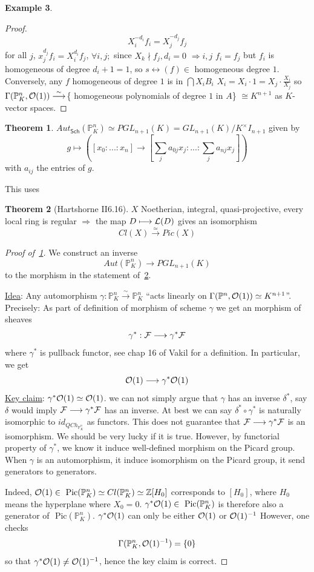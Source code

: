 \documentclass[11pt]{article}
\theoremstyle{definition}
\newtheorem{thm}{Theorem}[section]
\newtheorem{ex}[thm]{Example}
\newcommand{\pic}{\text{ Pic}}
\newcommand{\proj}{\mathbb P}
\newcommand{\intg}{\mathbb Z}
\newcommand{\calf}{{\cal F}}
\newcommand{\call}{{\cal L}}
\newcommand{\calo}{{\cal O}}
\newcommand{\Lrta}{\Longrightarrow}
\newcommand{\lrta}{\longrightarrow}
\newcommand{\llrta}{\longleftrightarrow}
\begin{document}
\begin{ex}
\begin{enumerate}[label=\boxed{\arabic*}]
\begin{proof}
 $$
 X_i^{-d_i}f_i=X_j^{-d_j}f_j
 $$
 for all $j$,
 $x_j^{d_j} f_i=X_i^{d_i}f_j$, $\forall i,j;$ since $X_k\nmid f_j, d_i=0$ $\Lrta i,j$ $f_i=f_j$ but $f_i$ is homogeneous of degree $d_{i}+1=1$, so $s\llrta (f)\in$ homogeneous degree $1$. Conversely, any $f$ homogeneous of degree $1$ is in $\bigcap X_i B_i$ $X_i=X_i\cdot 1=X_j\cdot \frac{X_i}{X_j}$ so $\Gamma(\proj^n_K,\calo(1))\overset{\sim}{\lrta}$\{ homogeneous polynomials of degree $1$ in $A$\} $\cong K^{n+1}$ as $K$-vector spaces. 
 \end{proof}
\begin{thm}\label{thm:aut_Proj}
$Aut_{\mathsf{Sch}}(\proj^n_K)\simeq PGL_{n+1}(K)=GL_{n+1}(K)/K^\times I_{n+1}$ given by
$$
g\longmapsto ([x_0:...:x_n]\lrta[\sum_j a_{0j}x_j:...:\sum_j a_{nj} x_j]) 
$$
with $a_{ij}$ the entries of $g$.  
\end{thm}
This uses
\begin{thm}[Hartshorne II6.16]
\label{thm:Hart_II_6.16}$X$ Noetherian, integral, quasi-projective, every local ring is regular
$\Lrta$ the map $D\longmapsto \call(D)$ gives an isomorphism 
$$
Cl(X)\overset{\simeq}{\lrta}Pic(X)
$$
\begin{proof}[Proof of~\ref{thm:aut_Proj}]
We construct an inverse
$$
Aut(\proj^n_K)\lrta PGL_{n+1}(K)
$$
to the morphism in the statement of~\ref{thm:Hart_II_6.16}. 

\underline{Idea}: Any automorphism $\gamma:\proj^n_K\overset{\sim}{\lrta}\proj^n_K$ ``acts linearly on $\Gamma(\proj^n,\calo(1))\simeq K^{n+1}$''. Precisely: As part of definition of morphism of scheme $\gamma$ we get an morphism of sheaves
$$
\gamma^*:\calf\lrta \gamma^*\calf
$$
where $\gamma^*$ is pullback functor, see chap 16 of Vakil for a definition.
In particular, we get 
$$
\calo(1)\lrta\gamma^*\calo(1)
$$
\underline{Key claim}: $\gamma^*\calo(1)\simeq \calo(1)$. {\color{red} we can not simply argue that $\gamma$ has an inverse $\delta^*$, say $\delta$ would imply $\calf\lrta\gamma^*\calf$ has an inverse. At best we can say $\delta^*\circ\gamma^*$ is naturally isomorphic to $id_{QCh_{\proj^n_K}}$ as functors. This does not guarantee that $\calf\lrta\gamma^*\calf$ is an isomorphism. We should be very lucky if it is true.} 
However, by functorial property of $\gamma^*$, we know it induce well-defined morphism on the Picard group. When $\gamma$ is an automorphism, it induce isomorphism on the Picard group, it send generators to generators.

Indeed, $\calo(1)\in \pic(\proj^n_K)\simeq Cl(\proj^n_K)\simeq \intg[H_0]$ corresponds to $[H_0]$, where $H_0$ means the hyperplane where $X_0=0$.
$\gamma^*\calo(1)\in \pic(\proj^n_K)$ is therefore also a generator of $\pic(\proj^n_K)$. $\gamma^*\calo(1)$ can only be either $\calo(1)$ or $\calo(1)^{-1}$ However, one checks 
$$
\Gamma(\proj^n_K,\calo(1)^{-1})=\{0\}
$$
so that  $\gamma^*\calo(1)\neq \calo(1)^{-1}$, hence the key claim is correct.


\end{proof}
\end{thm}
\end{enumerate}
\end{ex}
\end{document}
